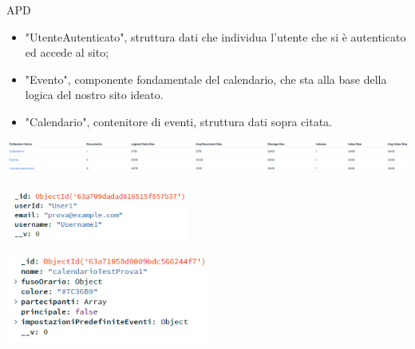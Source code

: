 \begin{listaPersonale} {APD}
\begin{itemize}
        \item "UtenteAutenticato", struttura dati che individua l'utente che si è autenticato ed accede al sito;
        \item "Evento", componente fondamentale del calendario, che sta alla base della logica del nostro sito ideato.
        \item "Calendario", contenitore di eventi, struttura dati sopra citata.
    \end{itemize}
    \begin{center}
        \includegraphics[width=1.1\textwidth, height=0.07\textheight]{img/png/DB/collections.png}
    \end{center}
    \begin{center}
        \includegraphics[width=0.45\textwidth, height=0.1\textheight]{img/png/DB/utente_autenticato.png}
    \end{center}
    \begin{center}
        \includegraphics[width=0.5\textwidth, height=0.15\textheight]{img/png/DB/calendario.png}
    \end{center}
    \begin{center}

\end{center}
\end{listaPersonale}
